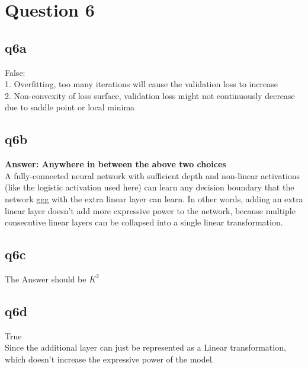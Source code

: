 \documentclass[12pt]{article}
\begin{document}
\newpage
\section{Question 6}
\subsection{q6a}
\begin{tcolorbox}[myblock, title = answer]
  False:\\
1. Overfitting, too many iterations will cause the validation loss to increase \\
2. Non-convexity of loss surface, validation loss might not continuously decrease due to saddle point or local minima
\end{tcolorbox}

\newpage
\subsection{q6b}
\begin{tcolorbox}[myblock, title = answer]
  \textbf{Answer: Anywhere in between the above two choices} \\
  A fully-connected neural network with sufficient depth and non-linear activations (like the logistic activation used here) can learn any decision boundary that the network ggg with the extra linear layer can learn. In other words, adding an extra linear layer doesn't add more expressive power to the network, because multiple consecutive linear layers can be collapsed into a single linear transformation.\\
\end{tcolorbox}

\newpage
\subsection{q6c}
\begin{tcolorbox}[myblock, title = answer]
   The Answer should be \( K^{2} \)
\end{tcolorbox}

\newpage
\subsection{q6d}
\begin{tcolorbox}[myblock, title = answer]
  True \\
  Since the additional layer can just be represented as a Linear transformation, which doesn't increase the expressive power of the model. 
\end{tcolorbox}
\end{document}
